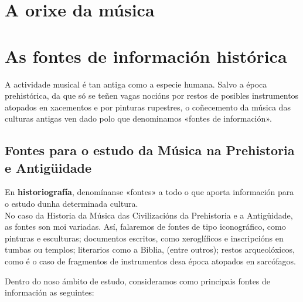 \documentclass[a4paper, twoside]{templates/ociamthesis}
\begin{document}
\hypertarget{a-orixe-da-muxfasica}{%
\section{A orixe da música}\label{a-orixe-da-muxfasica}}

\hypertarget{as-fontes-de-informaciuxf3n-histuxf3rica-2}{%
\section*{As fontes de información histórica}\label{as-fontes-de-informaciuxf3n-histuxf3rica-2}}

A actividade musical é tan antiga como a especie humana. Salvo a época prehistórica, da que só se teñen vagas nocións por restos de posibles instrumentos atopados en xacementos e por pinturas rupestres, o coñecemento da música das culturas antigas ven dado polo que denominamos «fontes de información».

\hypertarget{fontes-para-o-estudo-da-muxfasica-na-prehistoria-e-antiguxfcidade-2}{%
\subsection*{Fontes para o estudo da Música na Prehistoria e Antigüidade}\label{fontes-para-o-estudo-da-muxfasica-na-prehistoria-e-antiguxfcidade-2}}

En \textbf{historiografía}, denomínanse «fontes» a todo o que aporta información para o estudo dunha determinada cultura.\\
No caso da Historia da Música das Civilizacións da Prehistoria e a Antigüidade, as fontes son moi variadas. Así, falaremos de fontes de tipo iconográfico, como pinturas e esculturas; documentos escritos, como xeroglíficos e inscripcións en tumbas ou templos; literarios como a Biblia, (entre outros); restos arqueolóxicos, como é o caso de fragmentos de instrumentos desa época atopados en sarcófagos.

Dentro do noso ámbito de estudo, consideramos como principais fontes de información as seguintes:
\end{document}
